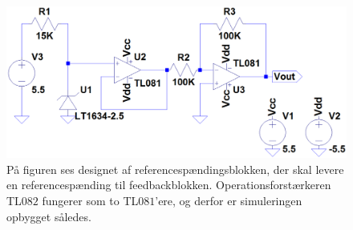 \begin{figure}[H]
	\centering
	\includegraphics[scale=0.4]{figures/cProblemloesning/Reference_komparator.PNG}
	\caption{På figuren ses designet af referencespændingsblokken, der skal levere en referencespænding til feedbackblokken. Operationsforstærkeren TL$082$ fungerer som to TL$081$'ere, og derfor er simuleringen opbygget således. \cite{Corporation2013}}
	\label{fig:ref_komparator}
\end{figure}

